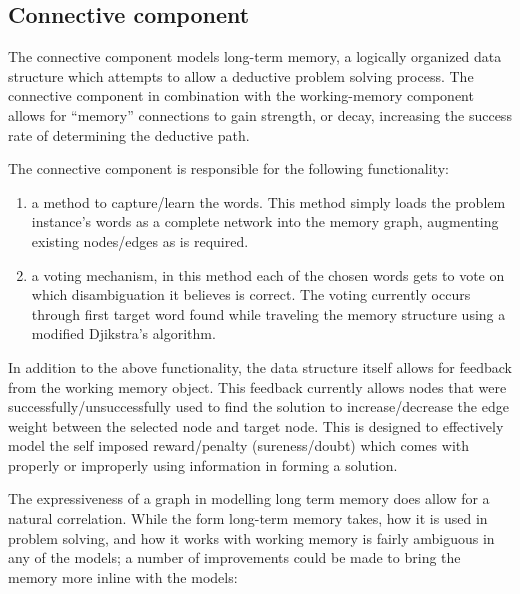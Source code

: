 \subsection{Connective component} 

The connective component models long-term
memory, a logically organized data structure which attempts to allow a deductive
problem solving process.  The connective component in combination with the
working-memory component allows for ``memory'' connections to gain strength, or
decay, increasing the success rate of determining the deductive path.

The connective component is responsible for the following functionality:

\begin{enumerate}
	\item a method to capture/learn the words.  This method simply loads the 
	problem instance's words as a complete network into the memory graph, 
	augmenting existing nodes/edges as is required.     
	\item a voting mechanism, in this method each of the chosen words gets to 
	vote on which disambiguation it believes is correct.  The voting currently 
	occurs through first target word found while traveling the memory structure 
	using a modified Djikstra's algorithm. 
\end{enumerate}

In addition to the above functionality, the data structure itself allows for
feedback from the working memory object.  This feedback currently allows nodes
that were successfully/unsuccessfully used to find the solution to
increase/decrease the edge weight between the selected node and target node.
This is designed to effectively model the self imposed reward/penalty
(sureness/doubt) which comes with properly or improperly using information in
forming a solution.

The expressiveness of a graph in modelling long term memory does allow for a
natural correlation. While the form long-term memory takes, how it is used in
problem solving, and how it works with working memory is fairly ambiguous in any
of the models; a number of improvements could be made to bring the memory more
inline with the models:

